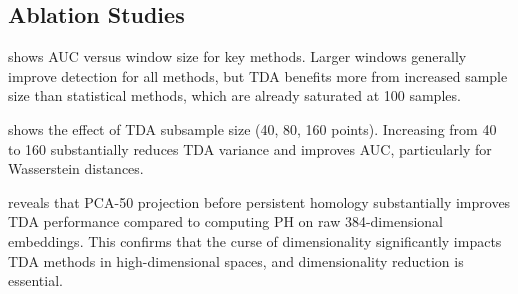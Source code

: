 \begin{table}[t]
    \centering
    \caption{AUC on synthetic topology-only drift in 50 dimensions (mean $\pm$ std across 5 seeds). AUC = 0.5 is chance. TDA H1 features uniquely detect loop drift where centroid shift fails.}
    \label{tab:synthetic}
\end{table}

\subsection{Ablation Studies}
\label{sec:ablation_results}

 shows AUC versus window size for key methods. Larger windows generally improve detection for all methods, but TDA benefits more from increased sample size than statistical methods, which are already saturated at 100 samples.

 shows the effect of TDA subsample size (40, 80, 160 points). Increasing from 40 to 160 substantially reduces TDA variance and improves AUC, particularly for Wasserstein distances.

 reveals that PCA-50 projection before persistent homology substantially improves TDA performance compared to computing PH on raw 384-dimensional embeddings. This confirms that the curse of dimensionality significantly impacts TDA methods in high-dimensional spaces, and dimensionality reduction is essential.


